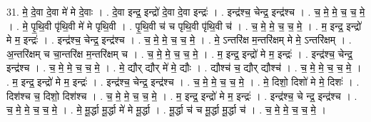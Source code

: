 \documentclass[17pt]{extarticle}
\begin{document}
31. मे॒ दे॒वा दे॒वा मे॑ मे दे॒वाः । . दे॒वा इन्द्र॒ इन्द्रो॑ दे॒वा दे॒वा इन्द्रः॑ । . इन्द्र॑श्च॒ चेन्द्र॒ इन्द्र॑श्च । . च॒ मे॒ मे॒ च॒ च॒ मे॒ । . मे॒ पृ॒थि॒वी पृ॑थि॒वी मे॑ मे पृथि॒वी । . पृ॒थि॒वी च॑ च पृथि॒वी पृ॑थि॒वी च॑ । . च॒ मे॒ मे॒ च॒ च॒ मे॒ । . म॒ इन्द्र॒ इन्द्रो॑ मे म॒ इन्द्रः॑ । . इन्द्र॑श्च॒ चेन्द्र॒ इन्द्र॑श्च । . च॒ मे॒ मे॒ च॒ च॒ मे॒ । . मे॒ ऽन्तरि॑क्ष म॒न्तरि॑क्षम् मे मे॒ ऽन्तरि॑क्षम् । . अ॒न्तरि॑क्षम् च चा॒न्तरि॑क्ष म॒न्तरि॑क्षम् च । . च॒ मे॒ मे॒ च॒ च॒ मे॒ । . म॒ इन्द्र॒ इन्द्रो॑ मे म॒ इन्द्रः॑ । . इन्द्र॑श्च॒ चेन्द्र॒ इन्द्र॑श्च । . च॒ मे॒ मे॒ च॒ च॒ मे॒ । . मे॒ द्यौर् द्यौर् मे॑ मे॒ द्यौः । . द्यौश्च॑ च॒ द्यौर् द्यौश्च॑ । . च॒ मे॒ मे॒ च॒ च॒ मे॒ । . म॒ इन्द्र॒ इन्द्रो॑ मे म॒ इन्द्रः॑ । . इन्द्र॑श्च॒ चेन्द्र॒ इन्द्र॑श्च । . च॒ मे॒ मे॒ च॒ च॒ मे॒ । . मे॒ दिशो॒ दिशो॑ मे मे॒ दिशः॑ । . दिश॑श्च च॒ दिशो॒ दिश॑श्च । . च॒ मे॒ मे॒ च॒ च॒ मे॒ । . म॒ इन्द्र॒ इन्द्रो॑ मे म॒ इन्द्रः॑ । . इन्द्र॑श्च॒ चे न्द्र॒ इन्द्र॑श्च । . च॒ मे॒ मे॒ च॒ च॒ मे॒ । . मे॒ मू॒र्द्धा मू॒र्द्धा मे॑ मे मू॒र्द्धा । . मू॒र्द्धा च॑ च मू॒र्द्धा मू॒र्द्धा च॑ । . च॒ मे॒ मे॒ च॒ च॒ मे॒ । \newline
\end{document}
